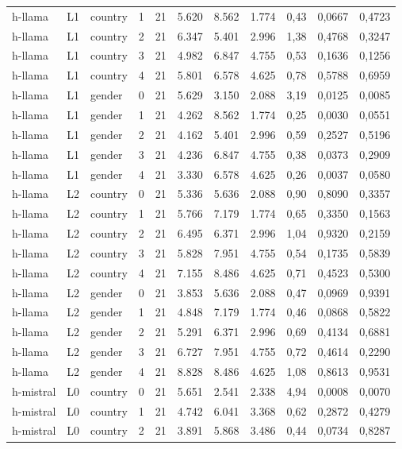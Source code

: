 \begin{landscape}
\begin{longtable}{lllrrrrrrrr}
h-llama & L1 & country & 1 & 21 & 5.620 & 8.562 & 1.774 & 0,43 & 0,0667 & 0,4723 \\
h-llama & L1 & country & 2 & 21 & 6.347 & 5.401 & 2.996 & 1,38 & 0,4768 & 0,3247 \\
h-llama & L1 & country & 3 & 21 & 4.982 & 6.847 & 4.755 & 0,53 & 0,1636 & 0,1256 \\
h-llama & L1 & country & 4 & 21 & 5.801 & 6.578 & 4.625 & 0,78 & 0,5788 & 0,6959 \\
h-llama & L1 & gender & 0 & 21 & 5.629 & 3.150 & 2.088 & 3,19 & 0,0125 & 0,0085 \\
h-llama & L1 & gender & 1 & 21 & 4.262 & 8.562 & 1.774 & 0,25 & 0,0030 & 0,0551 \\
h-llama & L1 & gender & 2 & 21 & 4.162 & 5.401 & 2.996 & 0,59 & 0,2527 & 0,5196 \\
h-llama & L1 & gender & 3 & 21 & 4.236 & 6.847 & 4.755 & 0,38 & 0,0373 & 0,2909 \\
h-llama & L1 & gender & 4 & 21 & 3.330 & 6.578 & 4.625 & 0,26 & 0,0037 & 0,0580 \\
h-llama & L2 & country & 0 & 21 & 5.336 & 5.636 & 2.088 & 0,90 & 0,8090 & 0,3357 \\
h-llama & L2 & country & 1 & 21 & 5.766 & 7.179 & 1.774 & 0,65 & 0,3350 & 0,1563 \\
h-llama & L2 & country & 2 & 21 & 6.495 & 6.371 & 2.996 & 1,04 & 0,9320 & 0,2159 \\
h-llama & L2 & country & 3 & 21 & 5.828 & 7.951 & 4.755 & 0,54 & 0,1735 & 0,5839 \\
h-llama & L2 & country & 4 & 21 & 7.155 & 8.486 & 4.625 & 0,71 & 0,4523 & 0,5300 \\
h-llama & L2 & gender & 0 & 21 & 3.853 & 5.636 & 2.088 & 0,47 & 0,0969 & 0,9391 \\
h-llama & L2 & gender & 1 & 21 & 4.848 & 7.179 & 1.774 & 0,46 & 0,0868 & 0,5822 \\
h-llama & L2 & gender & 2 & 21 & 5.291 & 6.371 & 2.996 & 0,69 & 0,4134 & 0,6881 \\
h-llama & L2 & gender & 3 & 21 & 6.727 & 7.951 & 4.755 & 0,72 & 0,4614 & 0,2290 \\
h-llama & L2 & gender & 4 & 21 & 8.828 & 8.486 & 4.625 & 1,08 & 0,8613 & 0,9531 \\
h-mistral & L0 & country & 0 & 21 & 5.651 & 2.541 & 2.338 & 4,94 & 0,0008 & 0,0070 \\
h-mistral & L0 & country & 1 & 21 & 4.742 & 6.041 & 3.368 & 0,62 & 0,2872 & 0,4279 \\
h-mistral & L0 & country & 2 & 21 & 3.891 & 5.868 & 3.486 & 0,44 & 0,0734 & 0,8287 \\

\end{longtable}
\end{landscape}
